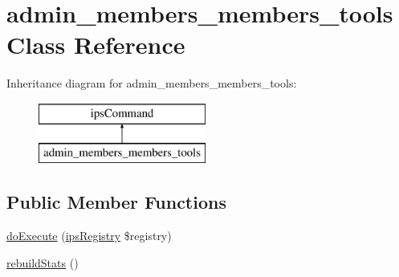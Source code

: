 \hypertarget{classadmin__members__members__tools}{\section{admin\-\_\-members\-\_\-members\-\_\-tools Class Reference}
\label{classadmin__members__members__tools}
}
Inheritance diagram for admin\-\_\-members\-\_\-members\-\_\-tools\-:\begin{figure}[H]
\begin{center}
\leavevmode
\includegraphics[height=2.000000cm]{classadmin__members__members__tools}
\end{center}
\end{figure}
\subsection*{Public Member Functions}
\begin{DoxyCompactItemize}
\item 
\hyperlink{classadmin__members__members__tools_afbc4e912a0604b94d47d66744c64d8ba}{do\-Execute} (\hyperlink{classips_registry}{ips\-Registry} \$registry)
\item 
\hyperlink{classadmin__members__members__tools_abfef8401af36417b80fb02573da229ef}{rebuild\-Stats} ()
\end{DoxyCompactItemize}
